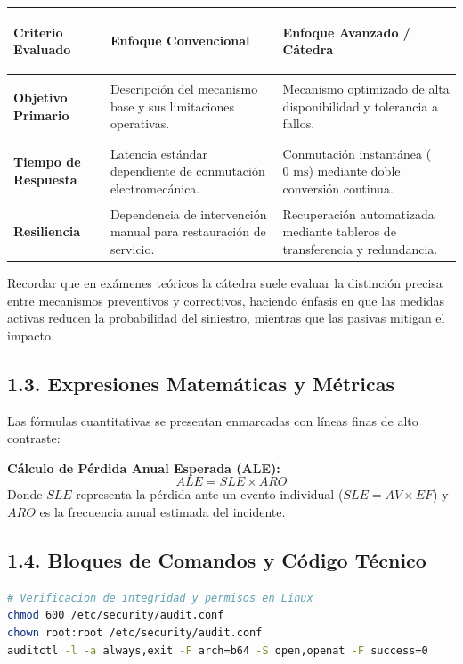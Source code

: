 \documentclass[10pt,a4paper,twoside]{extarticle}
\begin{document}
\begin{table}[h!]
\centering
\small
\begin{tabularx}{\textwidth}{@{} >{\bfseries\raggedright\arraybackslash}p{3.2cm} >{\raggedright\arraybackslash}p{5.5cm} >{\raggedright\arraybackslash}X @{}}
\toprule
Criterio Evaluado & Enfoque Convencional & Enfoque Avanzado / Cátedra \\
\midrule
\textbf{Objetivo Primario} & Descripción del mecanismo base y sus limitaciones operativas. & Mecanismo optimizado de alta disponibilidad y tolerancia a fallos. \\
\addlinespace
\textbf{Tiempo de Respuesta} & Latencia estándar dependiente de conmutación electromecánica. & Conmutación instantánea ($0\text{ ms}$) mediante doble conversión continua. \\
\addlinespace
\textbf{Resiliencia} & Dependencia de intervención manual para restauración de servicio. & Recuperación automatizada mediante tableros de transferencia y redundancia. \\
\bottomrule
\end{tabularx}
\end{table}

\begin{alertaparcial}
Recordar que en exámenes teóricos la cátedra suele evaluar la distinción precisa entre mecanismos preventivos y correctivos, haciendo énfasis en que las medidas activas reducen la probabilidad del siniestro, mientras que las pasivas mitigan el impacto.
\end{alertaparcial}

\subsection{1.3. Expresiones Matemáticas y Métricas}
Las fórmulas cuantitativas se presentan enmarcadas con líneas finas de alto contraste:

\begin{formulabox}
\textbf{Cálculo de Pérdida Anual Esperada (ALE):}
$$ALE = SLE \times ARO$$
Donde $SLE$ representa la pérdida ante un evento individual ($SLE = AV \times EF$) y $ARO$ es la frecuencia anual estimada del incidente.
\end{formulabox}

\subsection{1.4. Bloques de Comandos y Código Técnico}
\begin{lstlisting}[style=monocodestyle, language=bash]
# Verificacion de integridad y permisos en Linux
chmod 600 /etc/security/audit.conf
chown root:root /etc/security/audit.conf
auditctl -l -a always,exit -F arch=b64 -S open,openat -F success=0
\end{lstlisting}
\end{document}
